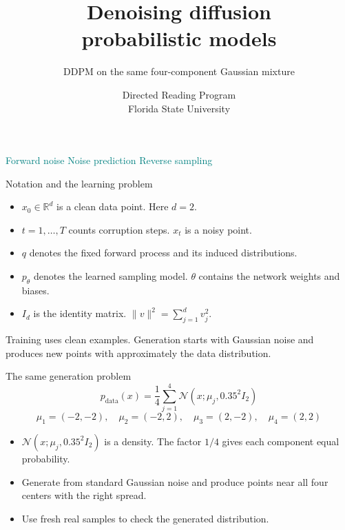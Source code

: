 \documentclass[aspectratio=169,11pt]{beamer}
\title{Denoising diffusion\\probabilistic models}
\subtitle{DDPM on the same four-component Gaussian mixture}
\author{\texorpdfstring{Directed Reading Program\\Florida State University}{Directed Reading Program, Florida State University}}
\date{}
\begin{document}
\begin{frame}
\titlepage
\par\vspace{-5mm}
\centering\textcolor{Teal}{Forward noise \quad Noise prediction \quad Reverse sampling}
\end{frame}

\begin{frame}{Notation and the learning problem}
\begin{itemize}\setlength\itemsep{3mm}
\item $x_0\in\mathbb R^d$ is a clean data point. Here $d=2$.
\item $t=1,\ldots,T$ counts corruption steps. $x_t$ is a noisy point.
\item $q$ denotes the fixed forward process and its induced distributions.
\item $p_\theta$ denotes the learned sampling model. $\theta$ contains the network weights and biases.
\item $I_d$ is the identity matrix. $\|v\|^2=\sum_{j=1}^d v_j^2$.
\end{itemize}
\par\vspace{3mm}
Training uses clean examples. Generation starts with Gaussian noise and produces new points with approximately the data distribution.
\end{frame}

\begin{frame}{The same generation problem}
\large
\[p_{\mathrm{data}}(x)=\frac14\sum_{j=1}^4\mathcal N(x;\mu_j,0.35^2I_2)\]
\normalsize
\[\mu_1=(-2,-2),\quad\mu_2=(-2,2),\quad
\mu_3=(2,-2),\quad\mu_4=(2,2)\]
\par\vspace{4mm}
\begin{itemize}\setlength\itemsep{4mm}
\item $\mathcal N(x;\mu_j,0.35^2I_2)$ is a density. The factor $1/4$ gives each component equal probability.
\item Generate from standard Gaussian noise and produce points near all four centers with the right spread.
\item Use fresh real samples to check the generated distribution.
\end{itemize}
\end{frame}
\end{document}
